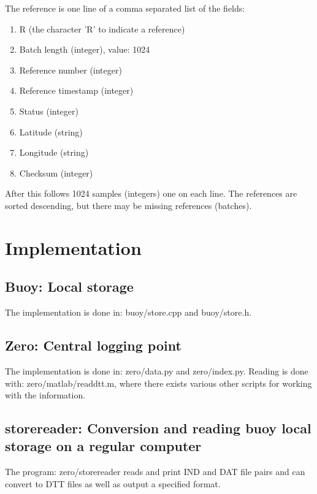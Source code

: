 \documentclass[a4paper]{article}
\begin{document}
\begin{multicols}{2}
  The reference is one line of a comma separated list of the fields: \\
  \begin{enumerate}
    \item R (the character 'R' to indicate a reference)
    \item Batch length (integer), value: 1024
    \item Reference number (integer)
    \item Reference timestamp (integer)
    \item Status (integer)
    \item Latitude (string)
    \item Longitude (string)
    \item Checksum (integer)
  \end{enumerate}

  After this follows 1024 samples (integers) one on each line. The
  references are sorted descending, but there may be missing references
  (batches).

  \section{Implementation}
  \subsection{Buoy: Local storage}
  The implementation is done in: buoy/store.cpp and buoy/store.h.

  \subsection{Zero: Central logging point}
  The implementation is done in: zero/data.py and zero/index.py. Reading
  is done with: zero/matlab/readdtt.m, where there exists various other
  scripts for working with the information.

  \subsection{storereader: Conversion and reading buoy local storage on a regular
  computer}
  The program: zero/storereader reads and print IND and DAT file pairs
  and can convert to DTT files as well as output a specified format.

\vspace{5em}
\printbibliography
\end{multicols}
\end{document}
